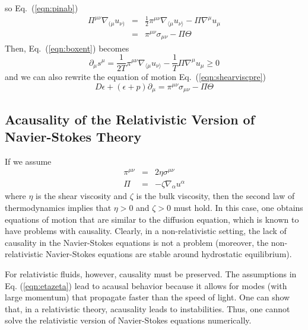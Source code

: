 \documentclass[aps,article]{revtex4}
\begin{document}
so Eq.\ (\ref{eqn:pinab})
\begin{eqnarray}
\Pi^{\mu\nu}\nabla_{(\mu}u_{\nu)}&=&\frac{1}{2}\pi^{\mu\nu}\nabla_{\langle\mu}u_{\nu\rangle}-\Pi\nabla^{\mu}u_{\mu}\\
&=&\pi^{\mu\nu}\sigma_{\mu\nu}-\Pi\Theta
\end{eqnarray}
Then, Eq.\ (\ref{eqn:boxent}) becomes
\begin{equation}\label{eqn:boxent}
\partial_{\mu} s^{\mu}=\frac{1}{2T}\pi^{\mu\nu}\nabla_{\langle\mu}u_{\nu\rangle}-\frac{1}{T}\Pi\nabla^{\mu}u_{\mu}\geq 0
\end{equation}
and we can also rewrite the equation of motion Eq.\ (\ref{eqn:shearviscpre})
\begin{equation}\label{eqn:shearviscallin}
\boxed{D\epsilon+\left(\epsilon+p\right)\partial_{\mu}=\pi^{\mu\nu}\sigma_{\mu\nu}-\Pi\Theta}
\end{equation}

\subsection{Acausality of the Relativistic Version of Navier-Stokes Theory}\label{sec:acausality}
If we assume
\begin{eqnarray}\label{eqn:etazeta}
\pi^{\mu\nu}&=&2\eta\sigma^{\mu\nu}\nonumber\\
\Pi&=&-\zeta\nabla_{\alpha}u^{\alpha}
\end{eqnarray}
where $\eta$ is the shear viscosity and $\zeta$ is the bulk viscosity, then the second law of thermodynamics implies that $\eta>0$  and $\zeta>0$ must hold. In this case, one obtains equations of motion that are similar to the diffusion equation, which is known to have problems with causality. Clearly, in a non-relativistic setting, the lack of causality in the Navier-Stokes equations is not a problem (moreover, the non-relativistic Navier-Stokes equations are stable around hydrostatic equilibrium). 

For relativistic fluids, however, causality must be preserved. The assumptions in Eq. (\ref{eqn:etazeta}) lead to acausal behavior because it allows for modes (with large momentum) that propagate faster than the speed of light. One can show that, in a relativistic theory, acausality leads to instabilities. Thus, one cannot solve the relativistic version of Navier-Stokes equations numerically. 
\end{document}

